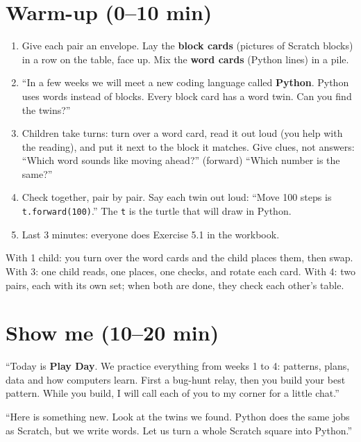 \section{Warm-up (0--10 min)}
\begin{unplugged}
\begin{enumerate}[leftmargin=1.4em,itemsep=1pt]
  \item Give each pair an envelope. Lay the \textbf{block cards} (pictures of Scratch blocks) in a row on the table, face up. Mix the \textbf{word cards} (Python lines) in a pile.
  \item \enquote{In a few weeks we will meet a new coding language called \textbf{Python}. Python uses words instead of blocks. Every block card has a word twin. Can you find the twins?}
  \item Children take turns: turn over a word card, read it out loud (you help with the reading), and put it next to the block it matches. Give clues, not answers: \enquote{Which word sounds like moving ahead?} (forward) \enquote{Which number is the same?}
  \item Check together, pair by pair. Say each twin out loud: \enquote{Move 100 steps is \texttt{t.forward(100)}.} The \texttt{t} is the turtle that will draw in Python.
  \item Last 3 minutes: everyone does Exercise 5.1 in the workbook.
\end{enumerate}
With 1 child: you turn over the word cards and the child places them, then swap. With 3: one child reads, one places, one checks, and rotate each card. With 4: two pairs, each with its own set; when both are done, they check each other's table.
\end{unplugged}

\section{Show me (10--20 min)}
\begin{teacherscript}
\enquote{Today is \textbf{Play Day}. We practice everything from weeks 1 to 4: patterns, plans, data and how computers learn. First a bug-hunt relay, then you build your best pattern. While you build, I will call each of you to my corner for a little chat.}

\enquote{Here is something new. Look at the twins we found. Python does the same jobs as Scratch, but we write words. Let us turn a whole Scratch square into Python.}
\end{teacherscript}

